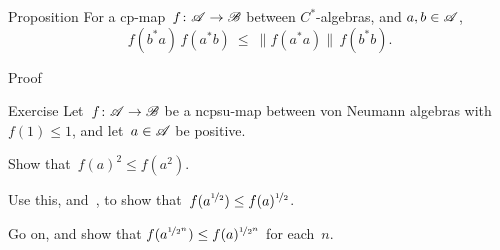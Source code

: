 \documentclass[a]{subfiles}
\begin{document}
%
%

\begin{parsec}%
\begin{point}{Proposition}%
For a cp-map~$f\colon \mathscr{A}\to\mathscr{B}$
 between $C^*$-algebras, and $a,b\in\mathscr{A}$, 
\begin{equation*}
f(b^*a)\,f(a^*b)\ \leq\ \|f(a^*a)\|\,f(b^*b).
\end{equation*}
\end{point}%
\begin{point}{Proof}%
\end{point}
\end{parsec}
%
%
%
\begin{parsec}%
\begin{point}{Exercise}%
Let~$f\colon \mathscr{A}\to\mathscr{B}$ be a ncpsu-map
between von Neumann algebras
with~$f(1)\leq 1$,
and let~$a\in \mathscr{A}$ be positive.
\begin{point}%
Show that~$f(a)^2 \leq f(a^2)$.
\end{point}
\begin{point}%
Use this, and~,
to show that~$f(a^{\nicefrac{1}{2}}) \leq f(a)^{\nicefrac{1}{2}}$.
\end{point}
\begin{point}%
Go on, and show that $f(a^{\nicefrac{1}{2^n}})
\leq f(a)^{\nicefrac{1}{2^n}}$ for each~$n$.
\end{point}
\end{point}
\end{parsec}
\end{document}
